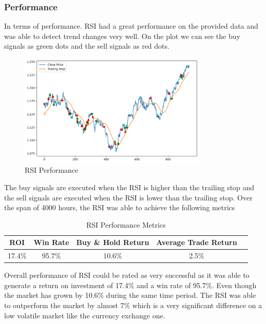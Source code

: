 \documentclass{imc-inf}
\begin{document}
	\subsubsection{Performance}
	
	In terms of performance. RSI had a great performance on the provided data and was able to detect trend changes very well. On the plot we can
	see the buy signals as green dots and the sell signals as red dots.
	\begin{figure}[h!]
		\centering
		\includegraphics[width=0.8\textwidth]{rsi_plot.png}
		\caption{RSI Performance}
		\label{fig:rsi_performance}	
	\end{figure}
	
	The buy signals are executed when the RSI is higher than the trailing stop
	and the sell signals are executed when the RSI is lower than the trailing stop. 
	Over the span of 4000 hours, the RSI was able to achieve the following metrics
	\begin{table}[h!]
		\centering
		\begin{tabular}{|c|c|c|c|c|}
			\hline
			\textbf{ROI} & \textbf{Win Rate} & \textbf{Buy \& Hold Return} & \textbf{Average Trade Return} \\ \hline
			17.4\%         & 95.7\%               & 10.6\%                         & 2.5\%                           \\ \hline
		\end{tabular}
		\caption{RSI Performance Metrics}
		\label{tab:rsi_performance_metrics}
	\end{table}
	
	Overall performance of RSI could be rated as very successful as it was able to generate a return on investment of 17.4\% and a win rate of 95.7\%.
	Even though the market has grown by 10.6\% during the same time period. The RSI was able to outperform the market by almost 7\% which is a very
	significant difference on a low volatile market like the currency exchange one.
	
\end{document}
